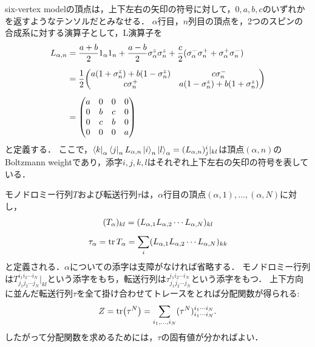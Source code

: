 \documentclass[dvipdfmx,9pt]{beamer}
\numberwithin{equation}{section}
\begin{document}
\begin{frame}
    six-vertex modelの頂点は，上下左右の矢印の符号に対して，$0,a,b,c$のいずれかを返すようなテンソルだとみなせる．
    $\alpha$行目，$n$列目の頂点を，2つのスピンの合成系に対する演算子として，L演算子を
    \begin{align}
        L_{\alpha,n} &
        = \frac{a+b}{2} 1_\alpha 1_n + \frac{a-b}{2} \sigma_\alpha^z \sigma_n^z + \frac{c}{2}(\sigma_\alpha^- \sigma_n^+ + \sigma_\alpha^+ \sigma_n^-)
        \\[5pt] &
        = \frac{1}{2}\mqty(
            a(1+\sigma_n^z) + b(1-\sigma_n^z) & 
            c\sigma_n^- \\
            c\sigma_n^+ &
            a(1-\sigma_n^z) + b(1+\sigma_n^z)
            )
        \\[5pt] &
        = \mqty(
            a&0&0&0 \\
            0&b&c&0 \\
            0&c&b&0 \\
            0&0&0&a
        )
    \end{align}
    と定義する．
    ここで，$\bra{k}_\alpha \bra{j}_n   L_{\alpha,n} \ket{i}_n \ket{l}_\alpha = (  L_{\alpha,n})^i_j|_{kl}$は頂点$(\alpha,n)$のBoltzmann weightであり，添字$i,j,k,l$はそれぞれ上下左右の矢印の符号を表している．
\end{frame}

\begin{frame}{}
      モノドロミー行列$T$および転送行列$\tau$は，$\alpha$行目の頂点$(\alpha,1),\ldots,(\alpha,N)$に対し，
    \begin{gather}
        (T_\alpha)_{kl} = (L_{\alpha,1} L_{\alpha,2} \cdots L_{\alpha,N})_{kl} 
        \\[5pt]
        \tau_\alpha = \tr T_\alpha = \sum_{i} (L_{\alpha,1} L_{\alpha,2} \cdots L_{\alpha,N})_{kk}
    \end{gather}
    と定義される．$\alpha$についての添字は支障がなければ省略する．
    モノドロミー行列は$T_{j_1j_2\cdots j_N}^{i_1i_2\cdots i_N}|_{kl}$という添字をもち，転送行列は$\tau_{j_1j_2\cdots j_N}^{i_1i_2\cdots i_N}$という添字をもつ．
    上下方向に並んだ転送行列$\tau$を全て掛け合わせてトレースをとれば分配関数が得られる:
    \begin{align}
        Z = \tr(\tau^N) = \sum_{i_1,\ldots,i_N} (\tau^N)_{i_1 \cdots i_N}^{i_1 \cdots i_N}.
    \end{align}
    したがって分配関数を求めるためには，$\tau$の固有値が分かればよい．
\end{frame}
\end{document}
